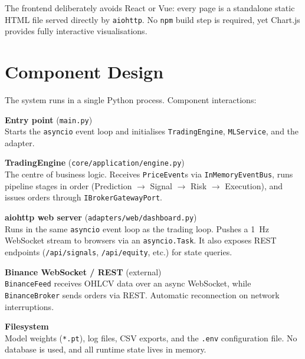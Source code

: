The frontend deliberately avoids React or Vue: every page is a standalone
static HTML file served directly by \texttt{aiohttp}. No \texttt{npm} build step
is required, yet Chart.js provides fully interactive visualisations.

\section{Component Design}
\label{sec:component_plan}

The system runs in a single Python process. Component interactions:

\noindent\textbf{Entry point} (\texttt{main.py})\\
Starts the \texttt{asyncio} event loop and initialises
\texttt{TradingEngine}, \texttt{MLService}, and the adapter.

\noindent\textbf{TradingEngine} (\texttt{core/application/engine.py})\\
The centre of business logic. Receives \texttt{PriceEvent}s via
\texttt{InMemoryEventBus}, runs pipeline stages in order
(Prediction $\to$ Signal $\to$ Risk $\to$ Execution), and issues orders
through \texttt{IBrokerGatewayPort}.

\noindent\textbf{aiohttp web server} (\texttt{adapters/web/dashboard.py})\\
Runs in the same \texttt{asyncio} event loop as the trading loop.
Pushes a 1~Hz WebSocket stream to browsers via an \texttt{asyncio.Task}.
It also exposes REST endpoints (\texttt{/api/signals}, \texttt{/api/equity},
etc.) for state queries.

\noindent\textbf{Binance WebSocket / REST} (external)\\
\texttt{BinanceFeed} receives OHLCV data over an async WebSocket, while
\texttt{BinanceBroker} sends orders via REST.
Automatic reconnection on network interruptions.

\noindent\textbf{Filesystem}\\
Model weights (\texttt{*.pt}), log files, CSV exports, and the
\texttt{.env} configuration file. No database is used, and
all runtime state lives in memory.

